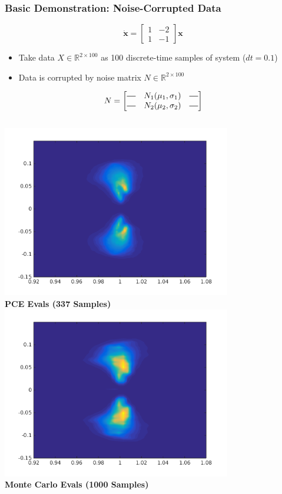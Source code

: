 \documentclass[9pt]{beamer}
\newcommand{\bv}[1]{\mathbf{#1}}
\begin{document}
\begin{frame}
\frametitle{Basic Demonstration: Noise-Corrupted Data}
\label{sec-3-3}

\newcommand*{\horzbar}{\rule[.5ex]{2.5ex}{0.5pt}}
\begin{equation*}
\dot{\bv{x}} =  \begin{bmatrix} 1 & -2 \\ 1 & -1 \end{bmatrix} \bv{x}
\end{equation*}

\begin{itemize}
\item Take data $X \in \mathbb{R}^{2\times100}$ as 100 discrete-time samples of system ($dt = 0.1$)
\item Data is corrupted by noise matrix $N \in \mathbb{R}^{2\times100}$
\end{itemize}

\begin{equation*}
N = \begin{bmatrix} \horzbar & N_1(\mu_1,\sigma_1) & \horzbar \\ \horzbar & N_2(\mu_2,\sigma_2) & \horzbar \end{bmatrix}
\end{equation*}

\begin{columns}[c]
    \centering
    \includegraphics[width=0.75\textwidth]{NoisyEigsPCE} \\
    {\bf PCE Evals (337 Samples)}
    \centering
    \includegraphics[width=0.75\textwidth]{NoisyEigsMC} \\
    {\bf Monte Carlo Evals (1000 Samples)}
\end{columns}
\end{frame}
\end{document}
